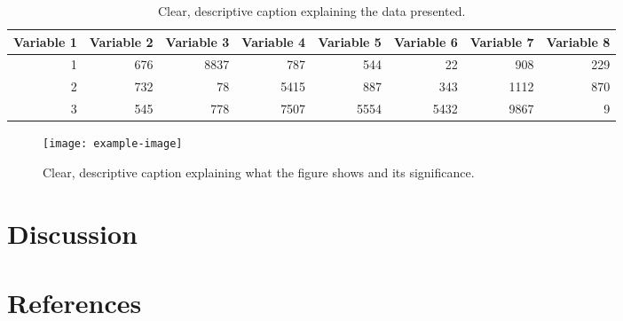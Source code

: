 \begin{table}[htbp]
    \centering
    \begin{tabular}{r r r r r r r r}
         Variable 1 & Variable 2 & Variable 3 & Variable 4 & Variable 5 & Variable 6 & Variable 7 & Variable 8 \\
         \hline
         1    & 676  & 8837 & 787  & 544  & 22   & 908  & 229  \\
         2    & 732  & 78   & 5415 & 887  & 343  & 1112 & 870  \\
         3    & 545  & 778  & 7507 & 5554 & 5432 & 9867 & 9    \\
         \hline
    \end{tabular}
    \caption{Clear, descriptive caption explaining the data presented.}
\end{table}

\begin{figure}[htbp]
    \centering
    \texttt{[image: example-image]}
    \caption{Clear, descriptive caption explaining what the figure shows and its significance.}
\end{figure}

\section{Discussion}
\lipsum[3]  %

\section{References}

